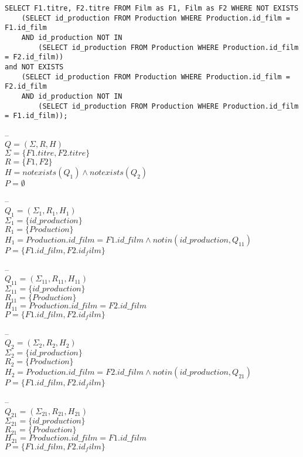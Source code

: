 \begin{myex}

\begin{verbatim}
SELECT F1.titre, F2.titre FROM Film as F1, Film as F2 WHERE NOT EXISTS 
	(SELECT id_production FROM Production WHERE Production.id_film = F1.id_film 
	AND id_production NOT IN 		
		(SELECT id_production FROM Production WHERE Production.id_film = F2.id_film))
and NOT EXISTS 
	(SELECT id_production FROM Production WHERE Production.id_film = F2.id_film 
	AND id_production NOT IN 
		(SELECT id_production FROM Production WHERE Production.id_film = F1.id_film));
\end{verbatim}
--
\\$Q = (\Sigma,R,H)$
\\$\Sigma = \{F1.titre, F2.titre\}$
\\$R = \{F1,F2\}$
\\$H = notexists(Q_1) \land notexists(Q_2)$
\\$P = \emptyset$

--
\\$Q_1 = (\Sigma_1,R_1,H_1)$
\\$\Sigma_1 = \{id\_production\}$
\\$R_1 = \{Production\}$
\\$H_1 = Production.id\_film = F1.id\_film \land notin(id\_production,Q_{11})$
\\$P =\{ F1.id\_film,F2.id_film\}$

--
\\$Q_{11} = (\Sigma_{11},R_{11},H_{11})$
\\$\Sigma_{11} = \{id\_production\}$
\\$R_{11} = \{Production\}$
\\$H_{11} =  Production.id\_film = F2.id\_film$
\\$P =\{ F1.id\_film,F2.id_film\}$

--
\\$Q_2 = (\Sigma_2,R_2,H_2)$
\\$\Sigma_2 = \{id\_production\}$
\\$R_2 = \{Production\}$
\\$H_2 = Production.id\_film = F2.id\_film \land notin(id\_production,Q_{21})$
\\$P =\{ F1.id\_film,F2.id_film\}$

--
\\$Q_{21} = (\Sigma_{21},R_{21},H_{21})$
\\$\Sigma_{21} = \{id\_production\}$
\\$R_{21} = \{Production\}$
\\$H_{21} =  Production.id\_film = F1.id\_film$
\\$P =\{ F1.id\_film,F2.id_film\}$

\end{myex}



